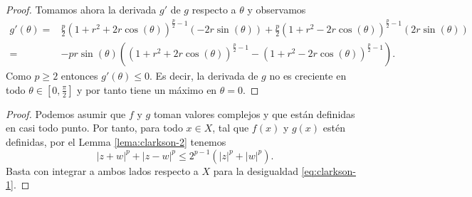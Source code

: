 \begin{proof}
    Tomamos ahora la derivada $g'$ de $ g $ respecto a $ \theta $ y observamos
    \begin{align}
        g'(\theta) = &\frac{p}{2}(1 + r^2 + 2r \cos(\theta))^{\frac{p}{2}-1} (-2r \sin(\theta)) + \frac{p}{2}(1 + r^2 - 2r \cos(\theta))^{\frac{p}{2}-1} (2r \sin(\theta)) \\
        = &-pr \sin(\theta) \left((1+r^2 + 2r\cos(\theta))^{\frac{p}{2}-1} - (1+r^2 - 2r\cos(\theta))^{\frac{p}{2}-1}\right).
    \end{align}
    Como $ p \geq 2 $ entonces $g'(\theta) \leq 0 $. Es decir, la derivada de $ g $ no es creciente en todo $ \theta \in \left[0, \frac{\pi}{2}\right] $ y por tanto tiene un máximo en $ \theta = 0 $.
\end{proof}

\Clarksoni
\begin{proof}
    Podemos asumir que $ f $ y $ g $ toman valores complejos y que están definidas en casi todo punto. Por tanto, para todo $ x \in X $, tal que $ f(x) $ y $ g(x) $ estén definidas, por el Lemma \ref{lema:clarkson-2} tenemos
    \begin{equation}
        \left| z + w \right|^p + \left| z - w \right|^p \leq 2^{p-1} \left( |z|^p + |w|^p \right).
    \end{equation}
    Basta con integrar a ambos lados respecto a $ X $ para la desigualdad \eqref{eq:clarkson-1}.
\end{proof}

